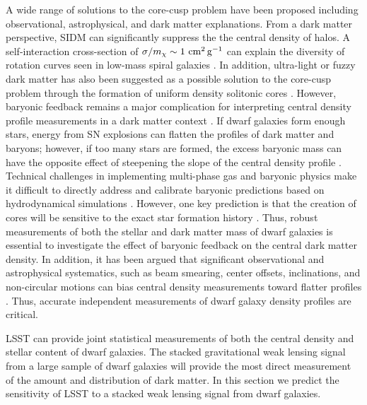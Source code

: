 A wide range of solutions to the core-cusp problem have been proposed including observational, astrophysical, and dark matter explanations.
From a dark matter perspective, SIDM can significantly suppress the the central density of halos.
A self-interaction cross-section of $\sigma / m_\chi \sim 1 \mathrm{\,\mathrm{\,cm}^2\mathrm{\,g}^{-1}}$ can explain the diversity of rotation curves seen in low-mass spiral galaxies \citep[\eg,][]{1504.01437,2017PhRvL.119k1102K,Tulin:2017ara}.
In addition, ultra-light or fuzzy dark matter has also been suggested as a possible solution to the core-cusp problem through the formation of uniform density solitonic cores \citep[\eg,][]{1502.03456,Hui:2017}. 
However, baryonic feedback remains a major complication for interpreting central density profile measurements in a dark matter context \citep{1996MNRAS.283L..72N,2005MNRAS.356..107R,2008Sci...319..174M,2012MNRAS.421.3464P,Madau:2014,Read:2016}. 
If dwarf galaxies form enough stars, energy from SN explosions can flatten the profiles of dark matter and baryons; however, if too many stars are formed, the excess baryonic mass can have the opposite effect of steepening the slope of the central density profile \citep{Bullock:2017}.
Technical challenges in implementing multi-phase gas and baryonic physics make it difficult to directly address and calibrate baryonic predictions based on hydrodynamical simulations \citep{Tollet:2016,1611.02281,Sawala:2016}.
However, one key prediction is that the creation of cores will be sensitive to the exact star formation history \citep[\eg,][]{governato2012,dicintio2014,onorbe2015,Read:2016,read2018,1811.11768,2019MNRAS.tmp....3R}.
Thus, robust measurements of both the stellar and dark matter mass of dwarf galaxies is essential to investigate the effect of baryonic feedback on the central dark matter density.
In addition, it has been argued that significant observational and astrophysical systematics, such as beam smearing, center offsets, inclinations, and non-circular motions can bias central density measurements toward flatter profiles \citep[\eg,][]{astro-ph/0006048,2004ApJ...617.1059R,2008AJ....136.2761O,2016MNRAS.462.3628R}. 
Thus, accurate independent measurements of dwarf galaxy density profiles are critical.

LSST can provide joint statistical measurements of both the central density and stellar content of dwarf galaxies. 
The stacked gravitational weak lensing signal from a large sample of dwarf galaxies will provide the most direct measurement of the amount and distribution of dark matter.  
In this section we predict the sensitivity of LSST to a stacked weak lensing signal from dwarf galaxies.

